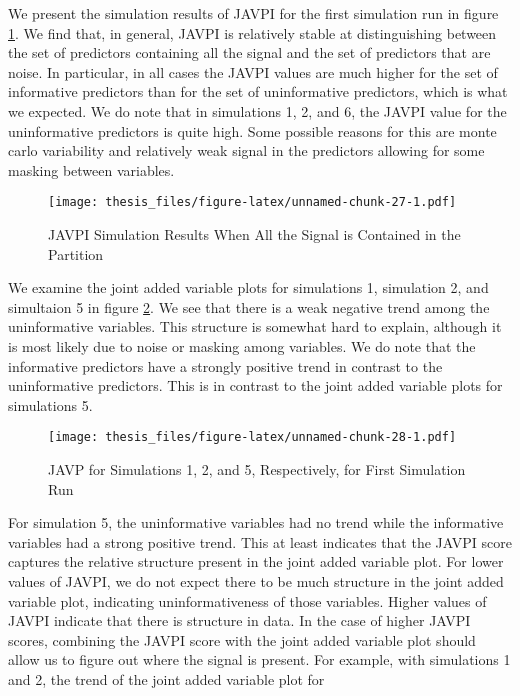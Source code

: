\documentclass[12pt,twoside]{reedthesis}
\theoremstyle{definition}
\theoremstyle{definition}
\theoremstyle{definition}
\theoremstyle{remark}
\begin{document}
We present the simulation results of JAVPI for the first simulation run
in figure \ref{JAVPIonesig}. We find that, in general, JAVPI is
relatively stable at distinguishing between the set of predictors
containing all the signal and the set of predictors that are noise. In
particular, in all cases the JAVPI values are much higher for the set of
informative predictors than for the set of uninformative predictors,
which is what we expected. We do note that in simulations 1, 2, and 6,
the JAVPI value for the uninformative predictors is quite high. Some
possible reasons for this are monte carlo variability and relatively
weak signal in the predictors allowing for some masking between
variables. \par 
\begin{figure}
\centering
\texttt{[image: thesis\_files/figure-latex/unnamed-chunk-27-1.pdf]}
\caption{\label{fig:unnamed-chunk-27}\label{JAVPIonesig}JAVPI Simulation
Results When All the Signal is Contained in the Partition}
\end{figure}
We examine the joint added variable plots for simulations 1, simulation
2, and simultaion 5 in figure \ref{siml1to5plots}. We see that there is
a weak negative trend among the uninformative variables. This structure
is somewhat hard to explain, although it is most likely due to noise or
masking among variables. We do note that the informative predictors have
a strongly positive trend in contrast to the uninformative predictors.
This is in contrast to the joint added variable plots for simulations 5.
\par 
\begin{figure}
\centering
\texttt{[image: thesis\_files/figure-latex/unnamed-chunk-28-1.pdf]}
\caption{\label{fig:unnamed-chunk-28}\label{siml1to5plots}JAVP for
Simulations 1, 2, and 5, Respectively, for First Simulation Run}
\end{figure}
For simulation 5, the uninformative variables had no trend while the
informative variables had a strong positive trend. This at least
indicates that the JAVPI score captures the relative structure present
in the joint added variable plot. For lower values of JAVPI, we do not
expect there to be much structure in the joint added variable plot,
indicating uninformativeness of those variables. Higher values of JAVPI
indicate that there is structure in data. In the case of higher JAVPI
scores, combining the JAVPI score with the joint added variable plot
should allow us to figure out where the signal is present. For example,
with simulations 1 and 2, the trend of the joint added variable plot for
\end{document}

